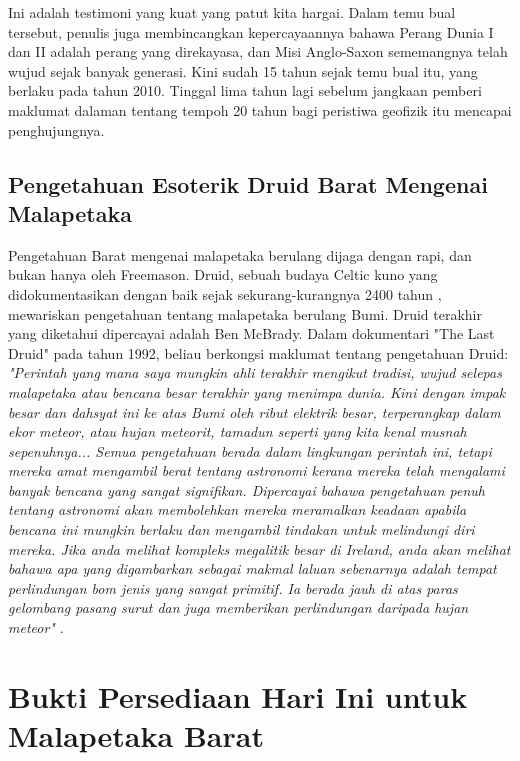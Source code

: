 \documentclass[10pt,twocolumn,letterpaper]{article}
\begin{document}
Ini adalah testimoni yang kuat yang patut kita hargai. Dalam temu bual tersebut, penulis juga membincangkan kepercayaannya bahawa Perang Dunia I dan II adalah perang yang direkayasa, dan Misi Anglo-Saxon sememangnya telah wujud sejak banyak generasi. Kini sudah 15 tahun sejak temu bual itu, yang berlaku pada tahun 2010. Tinggal lima tahun lagi sebelum jangkaan pemberi maklumat dalaman tentang tempoh 20 tahun bagi peristiwa geofizik itu mencapai penghujungnya.
\subsection{Pengetahuan Esoterik Druid Barat Mengenai Malapetaka}

Pengetahuan Barat mengenai malapetaka berulang dijaga dengan rapi, dan bukan hanya oleh Freemason. Druid, sebuah budaya Celtic kuno yang didokumentasikan dengan baik sejak sekurang-kurangnya 2400 tahun \cite{7}, mewariskan pengetahuan tentang malapetaka berulang Bumi. Druid terakhir yang diketahui dipercayai adalah Ben McBrady. Dalam dokumentari "The Last Druid" pada tahun 1992, beliau berkongsi maklumat tentang pengetahuan Druid: \textit{"Perintah yang mana saya mungkin ahli terakhir mengikut tradisi, wujud selepas malapetaka atau bencana besar terakhir yang menimpa dunia. Kini dengan impak besar dan dahsyat ini ke atas Bumi oleh ribut elektrik besar, terperangkap dalam ekor meteor, atau hujan meteorit, tamadun seperti yang kita kenal musnah sepenuhnya... Semua pengetahuan berada dalam lingkungan perintah ini, tetapi mereka amat mengambil berat tentang astronomi kerana mereka telah mengalami banyak bencana yang sangat signifikan. Dipercayai bahawa pengetahuan penuh tentang astronomi akan membolehkan mereka meramalkan keadaan apabila bencana ini mungkin berlaku dan mengambil tindakan untuk melindungi diri mereka. Jika anda melihat kompleks megalitik besar di Ireland, anda akan melihat bahawa apa yang digambarkan sebagai makmal laluan sebenarnya adalah tempat perlindungan bom jenis yang sangat primitif. Ia berada jauh di atas paras gelombang pasang surut dan juga memberikan perlindungan daripada hujan meteor"} \cite{8,9}.

\section{Bukti Persediaan Hari Ini untuk Malapetaka Barat}
\end{document}
